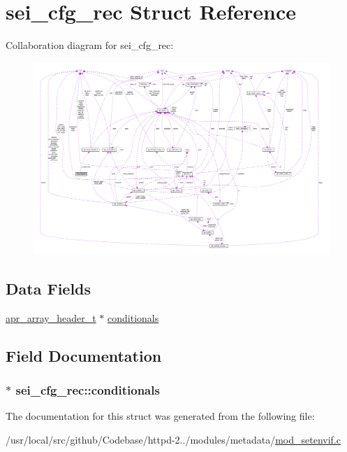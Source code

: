 \hypertarget{structsei__cfg__rec}{}\section{sei\+\_\+cfg\+\_\+rec Struct Reference}
\label{structsei__cfg__rec}


Collaboration diagram for sei\+\_\+cfg\+\_\+rec\+:
\nopagebreak
\begin{figure}[H]
\begin{center}
\leavevmode
\includegraphics[width=350pt]{structsei__cfg__rec__coll__graph}
\end{center}
\end{figure}
\subsection*{Data Fields}
\begin{DoxyCompactItemize}
\item 
\hyperlink{structapr__array__header__t}{apr\+\_\+array\+\_\+header\+\_\+t} $\ast$ \hyperlink{structsei__cfg__rec_a4a3950ca9cf84ddadda7b36abfdeeda6}{conditionals}
\end{DoxyCompactItemize}


\subsection{Field Documentation}
\subsubsection[{\texorpdfstring{conditionals}{conditionals}}]{$\ast$ sei\+\_\+cfg\+\_\+rec\+::conditionals}\hypertarget{structsei__cfg__rec_a4a3950ca9cf84ddadda7b36abfdeeda6}{}\label{structsei__cfg__rec_a4a3950ca9cf84ddadda7b36abfdeeda6}


The documentation for this struct was generated from the following file\+:\begin{DoxyCompactItemize}
\item 
/usr/local/src/github/\+Codebase/httpd-\/2../modules/metadata/\hyperlink{mod__setenvif_8c}{mod\+\_\+setenvif.\+c}\end{DoxyCompactItemize}
